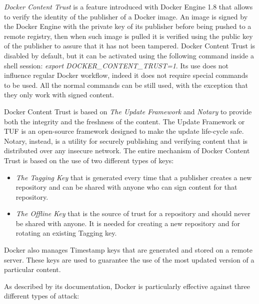 \documentclass[a4paper,12pt]{article}
\begin{document}
\textit{Docker Content Trust} \cite{docker_content_trust} is a feature
introduced with Docker Engine 1.8 that allows to verify the identity of the
publisher of a Docker image. An image is signed by the Docker Engine with the
private key of its publisher before being pushed to a remote registry, then when
such image is pulled it is verified using the public key of the publisher to
assure that it has not been tampered. Docker Content Trust is disabled by
default, but it can be activated using the following command inside a shell
session: \textit{export DOCKER\_CONTENT\_TRUST=1}. Its use does not influence
regular Docker workflow, indeed it does not require special commands to be used.
All the normal commands can be still used, with the exception that they only
work with signed content. \par Docker Content Trust is based on \textit{The
Update Framework} and \textit{Notary} to provide both the integrity and the
freshness of the content. The Update Framework or TUF is an open-source
framework designed to make the update life-cycle safe. Notary, instead, is a
utility for securely publishing and verifying content that is distributed over
any insecure network. The entire mechanism of Docker Content Trust is based on
the use of two different types of keys: 
\begin{itemize}
  \item \textit{The Tagging Key} that is generated every time that a publisher
  creates a new repository and can be shared with anyone who can sign content
  for that repository. 
  \item \textit{The Offline Key} that is the source of trust for a repository
  and should never be shared with anyone. It is needed for creating a new
  repository and for rotating an existing Tagging key. 
\end{itemize}
Docker also manages Timestamp keys that are generated and stored on a remote
server. These keys are used to guarantee the use of the most updated version of
a particular content. \par As described by its documentation, Docker is
particularly effective against three different types of attack:
\end{document}
